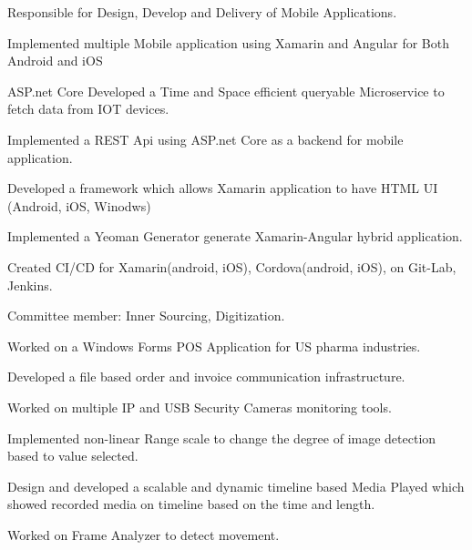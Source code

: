 \documentclass[]{deedy-resume-openfont}
\begin{document}
\begin{minipage}[t]{0.66\textwidth}
\begin{tightemize}
\item Responsible for Design, Develop and Delivery of Mobile Applications.
\item Implemented multiple Mobile application using Xamarin and Angular for Both Android and iOS
\item ASP.net Core Developed a Time and Space efficient queryable Microservice to fetch data from IOT devices.
\item Implemented a REST Api using ASP.net Core as a backend for mobile application.
\item Developed a framework which allows Xamarin application to have HTML UI (Android, iOS, Winodws)
\item Implemented a Yeoman Generator generate Xamarin-Angular hybrid application.
\item Created CI/CD for Xamarin(android, iOS), Cordova(android, iOS), on Git-Lab, Jenkins.
\item Committee member: Inner Sourcing, Digitization.
\end{tightemize}
\sectionsep

\vspace{\topsep} %
\begin{tightemize}
\item Worked on a Windows Forms POS Application for US pharma industries.
\item Developed a file based order and invoice communication infrastructure.
\end{tightemize}
\sectionsep

\begin{tightemize}
\item Worked on multiple IP and USB Security Cameras monitoring tools.
\item Implemented non-linear Range scale to change the degree of image detection based to value selected.
\item Design and developed a scalable and dynamic timeline based Media Played which showed recorded media on timeline based on the time and length.
\item Worked on Frame Analyzer to detect movement.
\end{tightemize}
\sectionsep


\end{minipage}
\end{document}
